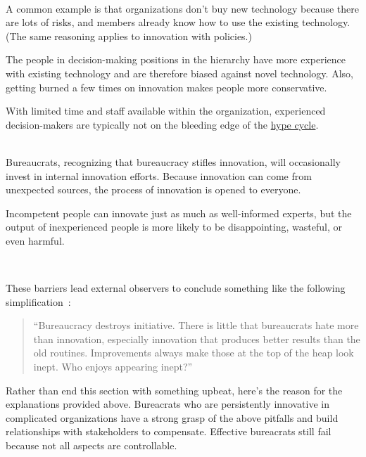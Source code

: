 \ \\

A common example is that organizations don't buy new technology because there are lots of risks, and members already know how to use the existing technology. (The same reasoning applies to innovation with policies.)

The people in decision-making positions in the hierarchy have more experience with existing technology and are therefore biased against novel technology. Also, getting burned a few times on innovation makes people more conservative.

With limited time and staff available within the organization, experienced decision-makers are typically not on the bleeding edge of the \href{https://en.wikipedia.org/wiki/Gartner_hype_cycle}{hype cycle}.

\ \\

Bureaucrats, recognizing that bureaucracy stifles innovation, will occasionally invest in internal innovation efforts. Because innovation can come from unexpected sources, the process of innovation is opened to everyone. 

Incompetent people can innovate just as much as well-informed experts, but the output of inexperienced people is more likely to be disappointing, wasteful, or even harmful. 

\ \\

\begin{samepage}
These barriers lead external observers to conclude something like the following simplification~\cite{1987_Herbert}:
\begin{quote}
``Bureaucracy destroys initiative. There is little that bureaucrats hate more than innovation, especially innovation that produces better results than the old routines.
%
%
Improvements always make those at the top of the heap look inept. Who enjoys appearing inept?''
\end{quote}
\end{samepage}

Rather than end this section with something upbeat, here's the reason for the explanations provided above. Bureacrats who are persistently innovative in complicated organizations have a strong grasp of the above pitfalls and build relationships with stakeholders to compensate. Effective bureacrats still fail because not all aspects are controllable. 


